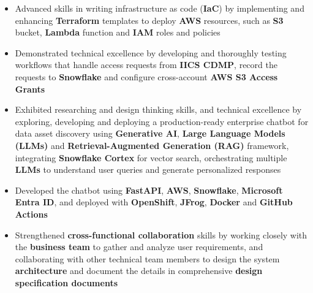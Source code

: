 \documentclass[12pt,letterpaper,sans]{moderncv}        %
\begin{document}
\begin{itemize}
  \item Advanced skills in writing infrastructure as code (\textbf{IaC}) by implementing and enhancing \textbf{Terraform} templates to deploy \textbf{AWS} resources, such as \textbf{S3} bucket, \textbf{Lambda} function and \textbf{IAM} roles and policies
  \item Demonstrated technical excellence by developing and thoroughly testing workflows that handle access requests from \textbf{IICS CDMP}, record the requests to \textbf{Snowflake} and configure cross-account \textbf{AWS S3 Access Grants}
  \item Exhibited researching and design thinking skills, and technical excellence by exploring, developing and deploying a production-ready enterprise chatbot for data asset discovery using \textbf{Generative AI}, \textbf{Large Language Models (LLMs)} and \textbf{Retrieval-Augmented Generation (RAG)} framework, integrating \textbf{Snowflake Cortex} for vector search, orchestrating multiple \textbf{LLMs} to understand user queries and generate personalized responses
  \item Developed the chatbot using \textbf{FastAPI}, \textbf{AWS}, \textbf{Snowflake}, \textbf{Microsoft Entra ID}, and deployed with \textbf{OpenShift}, \textbf{JFrog}, \textbf{Docker} and \textbf{GitHub Actions}
  \item Strengthened \textbf{cross-functional collaboration} skills by working closely with the \textbf{business team} to gather and analyze user requirements, and collaborating with other technical team members to design the system \textbf{architecture} and document the details in comprehensive \textbf{design specification documents}
\end{itemize}
\end{document}

